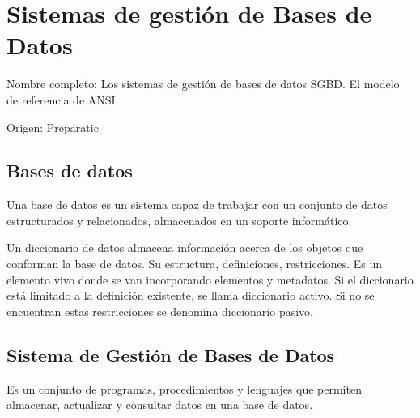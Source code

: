 \setcounter{section}{62} %
\section{Sistemas de gestión de Bases de Datos}

Nombre completo: Los sistemas de gestión de bases de datos SGBD. El modelo de referencia de ANSI

Origen: Preparatic

\localtableofcontents

\subsection{Bases de datos}
Una base de datos es un sistema capaz de trabajar con un conjunto de datos estructurados y relacionados, almacenados en un soporte informático.

Un diccionario de datos almacena información acerca de los objetos que conforman la base de datos. Su estructura, definiciones, restricciones. Es un elemento vivo donde se van incorporando elementos y metadatos. Si el diccionario está limitado a la definición existente, se llama diccionario activo. Si no se encuentran estas restricciones se denomina diccionario pasivo.


\subsection{Sistema de Gestión de Bases de Datos}
    Es un conjunto de programas, procedimientos y lenguajes que permiten almacenar, actualizar y consultar datos en una base de datos.

